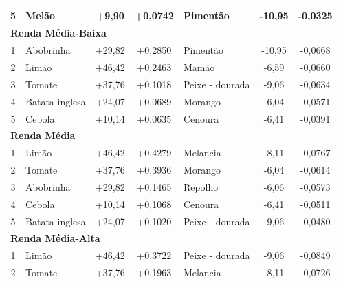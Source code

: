 \documentclass[10pt,a4paper]{article}
\begin{document}
\begin{table}[h!]
\begin{tabular*}{\textwidth}{@{\extracolsep{\fill}} c l c c | l c c @{}}
			5 & Melão & +9,90 & +0,0742 & Pimentão & -10,95 & -0,0325 \\
			
			\midrule
			
			\multicolumn{7}{l}{\textbf{\color{bisnavy}Renda Média-Baixa}} \\
			\midrule
			
			1 & Abobrinha & +29,82 & +0,2850 & Pimentão & -10,95 & -0,0668 \\
			
			2 & Limão & +46,42 & +0,2463 & Mamão & -6,59 & -0,0660 \\
			
			3 & Tomate & +37,76 & +0,1018 & Peixe - dourada & -9,06 & -0,0634 \\
			
			4 & Batata-inglesa & +24,07 & +0,0689 & Morango & -6,04 & -0,0571 \\
			
			5 & Cebola & +10,14 & +0,0635 & Cenoura & -6,41 & -0,0391 \\
			
			\midrule
			
			\multicolumn{7}{l}{\textbf{\color{bisnavy}Renda Média}} \\
			\midrule
			
			1 & Limão & +46,42 & +0,4279 & Melancia & -8,11 & -0,0767 \\
			
			2 & Tomate & +37,76 & +0,3936 & Morango & -6,04 & -0,0614 \\
			
			3 & Abobrinha & +29,82 & +0,1465 & Repolho & -6,06 & -0,0573 \\
			
			4 & Cebola & +10,14 & +0,1068 & Cenoura & -6,41 & -0,0511 \\
			
			5 & Batata-inglesa & +24,07 & +0,1020 & Peixe - dourada & -9,06 & -0,0480 \\
			
			\midrule
			
			\multicolumn{7}{l}{\textbf{\color{bisnavy}Renda Média-Alta}} \\
			\midrule
			
			1 & Limão & +46,42 & +0,3722 & Peixe - dourada & -9,06 & -0,0849 \\
			
			2 & Tomate & +37,76 & +0,1963 & Melancia & -8,11 & -0,0726 \\
			

\end{tabular*}
\end{table}
\end{document}
